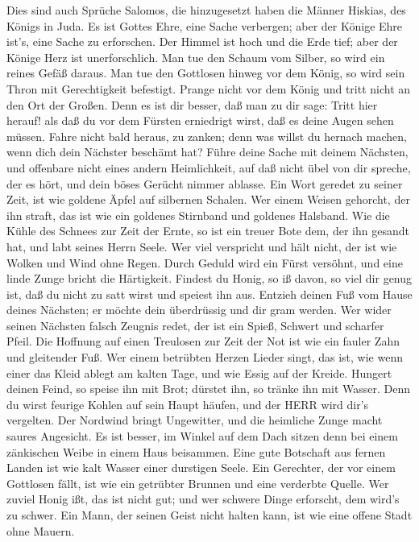  Dies sind auch Sprüche Salomos, die hinzugesetzt haben die
Männer Hiskias, des Königs in Juda.  Es ist Gottes Ehre,
eine Sache verbergen; aber der Könige Ehre ist's, eine Sache zu
erforschen.  Der Himmel ist hoch und die Erde tief; aber der
Könige Herz ist unerforschlich.  Man tue den Schaum vom
Silber, so wird ein reines Gefäß daraus.  Man tue den
Gottlosen hinweg vor dem König, so wird sein Thron mit Gerechtigkeit
befestigt.  Prange nicht vor dem König und tritt nicht an
den Ort der Großen.  Denn es ist dir besser, daß man zu dir
sage: Tritt hier herauf! als daß du vor dem Fürsten erniedrigt wirst,
daß es deine Augen sehen müssen.  Fahre nicht bald heraus,
zu zanken; denn was willst du hernach machen, wenn dich dein Nächster
beschämt hat?  Führe deine Sache mit deinem Nächsten, und
offenbare nicht eines andern Heimlichkeit,  auf daß nicht
übel von dir spreche, der es hört, und dein böses Gerücht nimmer
ablasse.  Ein Wort geredet zu seiner Zeit, ist wie goldene
Äpfel auf silbernen Schalen.  Wer einem Weisen gehorcht,
der ihn straft, das ist wie ein goldenes Stirnband und goldenes
Halsband.  Wie die Kühle des Schnees zur Zeit der Ernte, so
ist ein treuer Bote dem, der ihn gesandt hat, und labt seines Herrn
Seele.  Wer viel verspricht und hält nicht, der ist wie
Wolken und Wind ohne Regen.  Durch Geduld wird ein Fürst
versöhnt, und eine linde Zunge bricht die Härtigkeit. 
Findest du Honig, so iß davon, so viel dir genug ist, daß du nicht zu
satt wirst und speiest ihn aus.  Entzieh deinen Fuß vom
Hause deines Nächsten; er möchte dein überdrüssig und dir gram werden.
 Wer wider seinen Nächsten falsch Zeugnis redet, der ist
ein Spieß, Schwert und scharfer Pfeil.  Die Hoffnung auf
einen Treulosen zur Zeit der Not ist wie ein fauler Zahn und gleitender
Fuß.  Wer einem betrübten Herzen Lieder singt, das ist, wie
wenn einer das Kleid ablegt am kalten Tage, und wie Essig auf der
Kreide.  Hungert deinen Feind, so speise ihn mit Brot;
dürstet ihn, so tränke ihn mit Wasser.  Denn du wirst
feurige Kohlen auf sein Haupt häufen, und der HERR wird dir's vergelten.
 Der Nordwind bringt Ungewitter, und die heimliche Zunge
macht saures Angesicht.  Es ist besser, im Winkel auf dem
Dach sitzen denn bei einem zänkischen Weibe in einem Haus beisammen.
 Eine gute Botschaft aus fernen Landen ist wie kalt Wasser
einer durstigen Seele.  Ein Gerechter, der vor einem
Gottlosen fällt, ist wie ein getrübter Brunnen und eine verderbte
Quelle.  Wer zuviel Honig ißt, das ist nicht gut; und wer
schwere Dinge erforscht, dem wird's zu schwer.  Ein Mann,
der seinen Geist nicht halten kann, ist wie eine offene Stadt ohne
Mauern.

